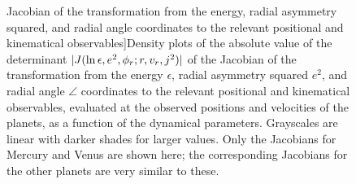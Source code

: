 \begin{figure}
  Jacobian of the transformation from the energy, radial asymmetry
  squared, and radial angle coordinates to the relevant positional and
  kinematical observables]{Density plots of the absolute value of the
  determinant $|J(\ln{\epsilon},e^2,\phi_r;r,v_r,j^2)|$ of the
  Jacobian of the transformation from the energy $\epsilon$, radial
  asymmetry squared $e^2$, and radial angle $\angle$ coordinates to
  the relevant positional and kinematical observables, evaluated at
  the observed positions and velocities of the planets, as a function
  of the dynamical parameters. Grayscales are linear with darker
  shades for larger values. Only the Jacobians for Mercury and Venus
  are shown here; the corresponding Jacobians for the other planets
  are very similar to these.}\label{fig:ejacobiansPlanets}
\end{figure}

